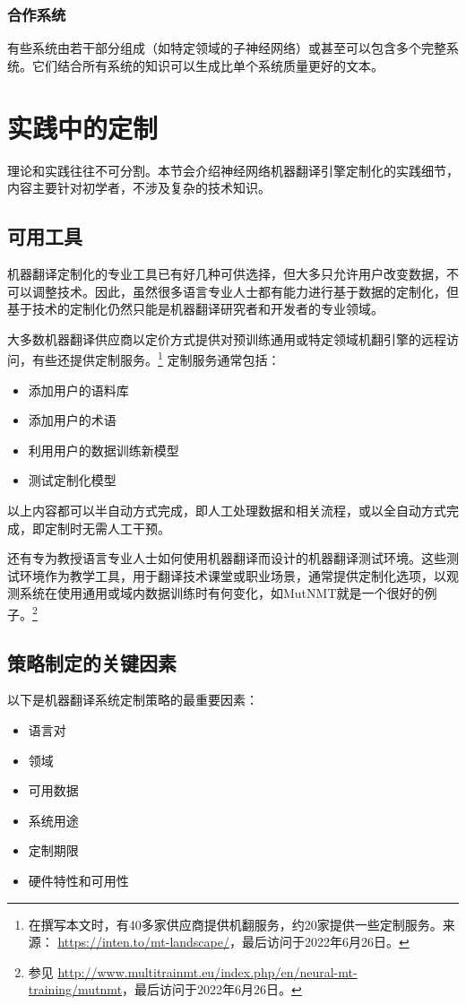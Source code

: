\documentclass[output=paper]{langscibook}
\begin{document}
\subsubsection{合作系统}
有些系统由若干部分组成（如特定领域的子神经网络）或甚至可以包含多个完整系统。它们结合所有系统的知识可以生成比单个系统质量更好的文本。


\section{实践中的定制}
理论和实践往往不可分割。本节会介绍神经网络机器翻译引擎定制化的实践细节，内容主要针对初学者，不涉及复杂的技术知识。

\subsection{可用工具}

机器翻译定制化的专业工具已有好几种可供选择，但大多只允许用户改变数据，不可以调整技术。因此，虽然很多语言专业人士都有能力进行基于数据的定制化，但基于技术的定制化仍然只能是机器翻译研究者和开发者的专业领域。

大多数机器翻译供应商以定价方式提供对预训练通用或特定领域机翻引擎的远程访问，有些还提供定制服务。\footnote{在撰写本文时，有40多家供应商提供机翻服务，约20家提供一些定制服务。来源： \url{https://inten.to/mt-landscape/}，最后访问于2022年6月26日。} 定制服务通常包括：
\begin{itemize}
\item 添加用户的语料库
\item 添加用户的术语
\item 利用用户的数据训练新模型
\item 测试定制化模型
\end{itemize}

以上内容都可以半自动方式完成，即人工处理数据和相关流程，或以全自动方式完成，即定制时无需人工干预。

还有专为教授语言专业人士如何使用机器翻译而设计的机器翻译测试环境。这些测试环境作为教学工具，用于翻译技术课堂或职业场景，通常提供定制化选项，以观测系统在使用通用或域内数据训练时有何变化，如MutNMT就是一个很好的例子。\footnote{参见 \url{http://www.multitrainmt.eu/index.php/en/neural-mt-training/mutnmt}，最后访问于2022年6月26日。}


\subsection{策略制定的关键因素}
以下是机器翻译系统定制策略的最重要因素：
\begin{itemize}
\item 语言对
\item 领域
\item 可用数据
\item 系统用途
\item 定制期限
\item 硬件特性和可用性
\end{itemize}
\end{document}
